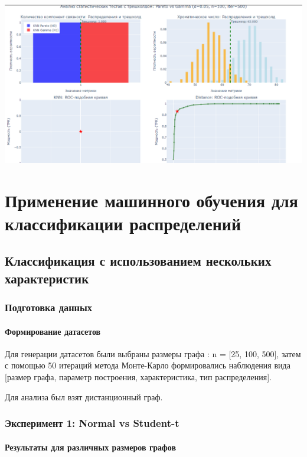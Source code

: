 \documentclass[a4paper,12pt]{report}
\begin{document}
\includegraphics[width=1\linewidth]{images/kuleshov_part3.png}

\part{Применение машинного обучения для классификации распределений}

\chapter{Классификация с использованием нескольких характеристик}

\section{Подготовка данных}

\subsection{Формирование датасетов}
Для генерации датасетов были выбраны размеры графа : n = [25, 100, 500], затем с помощью 50 итераций метода Монте-Карло формировались наблюдения вида [размер графа, параметр построения, характеристика, тип распределения]. 

Для анализа был взят дистанционный граф.

\section{Эксперимент 1: Normal vs Student-t}

\subsection{Результаты для различных размеров графов}
\end{document}
